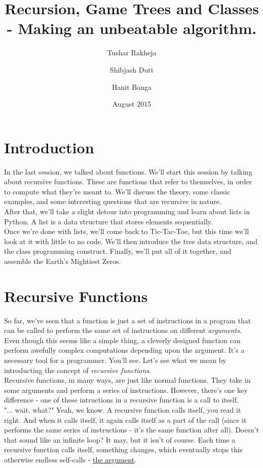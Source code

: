 \documentclass{article}
\title{Recursion, Game Trees and Classes - Making an unbeatable algorithm.}
\author[]{Tushar Rakheja}
\author[]{Shibjash Dutt}
\author[]{Hanit Banga}
\affil[]{\texttt{Instructors @ Endofline Computer Club}}
\date{August 2015}
\begin{document}
\maketitle

\section{Introduction}

In the last session, we talked about functions. We'll start this session by talking about recursive functions. These are functions that refer to themselves, in order to compute what they're meant to. We'll discuss the theory, some classic examples, and some interesting questions that are recursive in nature. \\

\noindent After that, we'll take a slight detour into programming and learn about lists in Python. A list is a data structure \cite{DSinPres_Slide} that stores elements sequentially.\\

\noindent Once we're done with lists, we'll come back to Tic-Tac-Toe, but this time we'll look at it with little to no code. We'll then introduce the tree data structure, and the class programming construct. Finally, we'll put all of it together, and assemble the Earth's Mightiest Zeros. 

\section{Recursive Functions}

\noindent So far, we've seen that a function is just a set of instructions in a program that can be called to perform the same set of instructions on different \textit{arguments}. Even though this seems like a simple thing, a cleverly designed function can perform awefully complex computations depending upon the argument. It's a necessary tool for a programmer. You'll see. Let's see what we mean by introducting the concept of \textit{recursive functions}. \\

\noindent Recursive functions, in many ways, are just like normal functions. They take in some arguments and perform a series of instructions. However, there's one key difference - one of these intructions in a recursive function is a call to itself. \\

\noindent "... wait, what?" Yeah, we know. A recursive function calls itself, you read it right. And when it calls itself, it again calls itself as a part of the call (since it performs the same series of instructions - it's the same function after all). Doesn't that sound like an infinite loop? It may, but it isn't of course. Each time a recursive function calls itself, something changes, which eventually stops this otherwise endless self-calls - \underline{the argument}. \\
\end{document}
